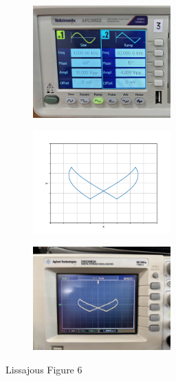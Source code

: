 \documentclass[a4paper,12pt]{article}
\begin{document}
\begin{figure}[h!]
	\begin{subfigure}[b]{10pt}
		\includegraphics[width = 150pt]{figs/fig6.jpeg}
	\end{subfigure}
	\hspace{120pt}
	\begin{subfigure}[b]{10pt}
		\includegraphics[width = 150pt]{figs/fig6.png}
	\end{subfigure}
	\hspace{130pt}
	\begin{subfigure}[b]{10pt}
		\includegraphics[width = 150pt]{figs/fig6_1.jpeg}
	\end{subfigure}
	\caption{Lissajous Figure 6}
\end{figure}
\end{document}

